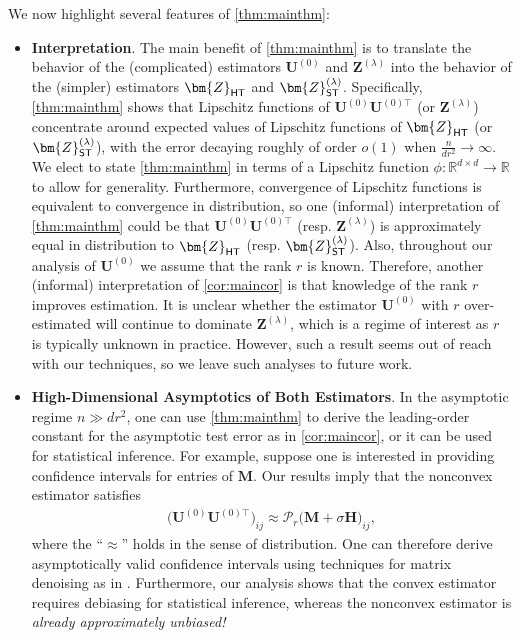 \documentclass[10pt]{article}
\theoremstyle{definition}
\begin{document}
We now highlight several features of \cref{thm:mainthm}:
\begin{itemize}
\item \textbf{Interpretation}. The main benefit of \cref{thm:mainthm} is to translate the behavior of the (complicated) estimators $\bm{U}^{(0)}$ and $\bm{Z}^{(\lambda)}$ into the behavior of the (simpler) estimators $\bm{Z}_{{\sf HT}}$ and $\bm{Z}_{{\sf ST}}^{(\lambda)}$. Specifically, \cref{thm:mainthm} shows that  Lipschitz functions of $\bm{U}^{(0)}\bm{U}^{(0)\top}$ (or $\bm{Z}^{(\lambda)}$) concentrate around expected values of Lipschitz functions of $\bm{Z}_{{\sf HT}}$ (or $\bm{Z}_{{\sf ST}}^{(\lambda)}$), 
with the error decaying roughly of order $o(1)$ when $\frac{n}{d r^2} \to \infty$. We elect to state \cref{thm:mainthm} in terms of a Lipschitz function $\phi:\mathbb{R}^{d\times d} \to \mathbb{R}$ to allow for generality.  Furthermore, convergence of Lipschitz functions is equivalent to convergence in distribution, so one (informal) interpretation of  \cref{thm:mainthm} could be that $\bm{U}^{(0)} \bm{U}^{(0)\top}$ (resp. $\bm{Z}^{(\lambda)}$) is approximately equal in distribution to $\bm{Z}_{{\sf HT}}$ (resp. $\bm{Z}_{{\sf ST}}^{(\lambda)}$). Also, throughout our analysis of $\bm{U}^{(0)}$ we assume that the rank $r$ is known.  Therefore, another (informal) interpretation of \cref{cor:maincor} is that knowledge of the rank $r$ improves estimation.  It is unclear whether the estimator $\bm{U}^{(0)}$ with $r$ over-estimated will continue to dominate $\bm{Z}^{(\lambda)}$, which is a regime of interest as $r$ is typically unknown in practice. However, such a result seems out of reach with our techniques, so we leave such analyses to future work.
  \item \textbf{High-Dimensional Asymptotics of Both Estimators}.   In the asymptotic regime $n \gg d r^2$, one can use \cref{thm:mainthm} to derive the leading-order constant for the asymptotic test error as in \cref{cor:maincor}, or it can be used for statistical inference. For example, suppose one is interested in providing confidence intervals for entries of $\bm{M}$.  Our results imply that the nonconvex estimator satisfies
  \begin{align*}
      \bigg(\bm{U}^{(0)} \bm{U}^{(0)\top}\bigg)_{ij} \approx \mathcal{P}_r\bigg( \bm{M} + \sigma \bm{H} \bigg)_{ij},
  \end{align*}
  where the ``$\approx$'' holds in the sense of distribution.  One can therefore derive asymptotically valid confidence intervals using techniques for matrix denoising as in \citet{chen_spectral_2021}.  Furthermore, our analysis shows that the convex estimator requires debiasing for statistical inference, whereas the nonconvex estimator is \emph{already approximately unbiased!} 


\end{itemize}
\end{document}
